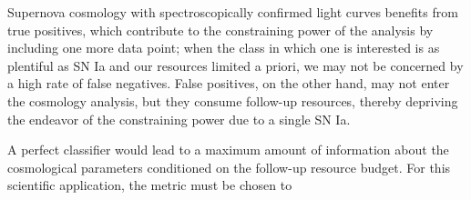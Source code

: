 \label{sec:spec_sncosmo}
Supernova cosmology with spectroscopically confirmed light curves benefits from true positives, which contribute to the constraining power of the analysis by including one more data point;
when the class in which one is interested is as plentiful as SN Ia and our resources limited a priori, we may not be concerned by a high rate of false negatives.
False positives, on the other hand, may not enter the cosmology analysis, but they consume follow-up resources, thereby depriving the endeavor of the constraining power due to a single SN Ia.

A perfect classifier would lead to a maximum amount of information about the cosmological parameters conditioned on the follow-up resource budget.
For this scientific application, the metric must be chosen to 

